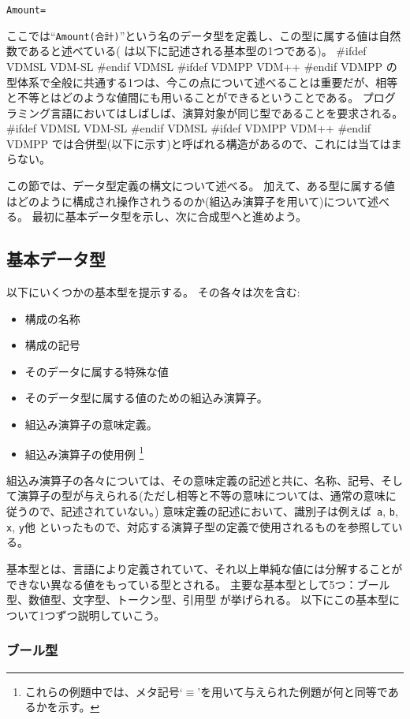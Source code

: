 \documentclass[\pformat,12pt]{jarticle}
\newcommand{\vdmslpp}[2]{%
#ifdef VDMSL
#1
#endif VDMSL
#ifdef VDMPP
#2
#endif VDMPP
}
\newcommand{\vdmsl}{VDM-SL}
\newcommand{\vdmpp}{VDM++}
\begin{document}
\begin{alltt}
  Amount = 
\end{alltt}
ここでは``{\tt Amount(合計)}''という名のデータ型を定義し、この型に属する値は自然数であると述べている( は以下に記述される基本型の1つである)。
\vdmslpp{\vdmsl}{\vdmpp}の型体系で全般に共通する1つは、今この点について述べることは重要だが、相等と不等とはどのような値間にも用いることができるということである。 
プログラミング言語においてはしばしば、演算対象が同じ型であることを要求される。
\vdmslpp{\vdmsl}{\vdmpp}では合併型(以下に示す)と呼ばれる構造があるので、これには当てはまらない。

この節では、データ型定義の構文について述べる。
加えて、ある型に属する値はどのように構成され操作されうるのか(組込み演算子を用いて)について述べる。
最初に基本データ型を示し、次に合成型へと進めよう。

\subsection{基本データ型}

以下にいくつかの基本型を提示する。
その各々は次を含む:

\begin{itemize}
\item 構成の名称
\item 構成の記号
\item そのデータに属する特殊な値
\item そのデータ型に属する値のための組込み演算子。
\item 組込み演算子の意味定義。
\item 組込み演算子の使用例
  \footnote{これらの例題中では、メタ記号`$\equiv$'を用いて与えられた例題が何と同等であるかを示す。}
\end{itemize}
組込み演算子の各々については、その意味定義の記述と共に、名称、記号、そして演算子の型が与えられる(ただし相等と不等の意味については、通常の意味に従うので、記述されていない。)
意味定義の記述において、識別子は例えば\ {\tt a}, {\tt b}, {\tt x}, {\tt y}他 といったもので、対応する演算子型の定義で使用されるものを参照している。

基本型とは、言語により定義されていて、それ以上単純な値には分解することができない異なる値をもっている型とされる。
主要な基本型として5つ：ブール型、数値型、文字型、トークン型、引用型 が挙げられる。
以下にこの基本型について1つずつ説明していこう。

\subsubsection{ブール型}\label{bool}
\end{document}

